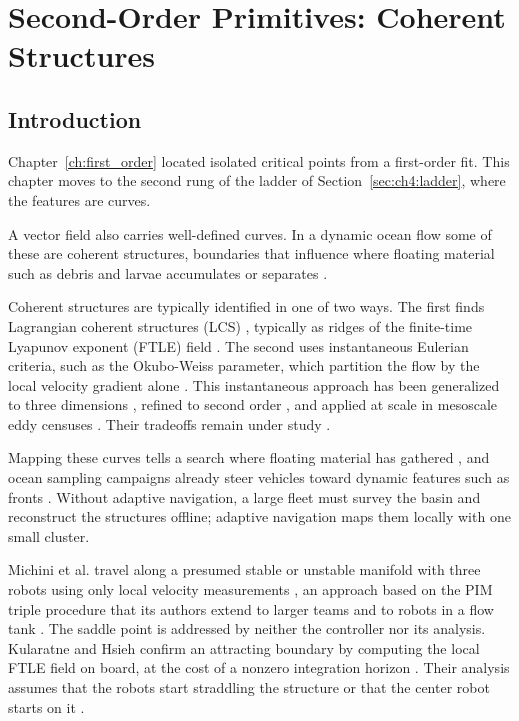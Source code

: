 \chapter{Second-Order Primitives: Coherent Structures}
\label{ch:second_order}

\section{Introduction}
\label{sec:ch7:intro}

Chapter~\ref{ch:first_order} located isolated critical points from a
first-order fit. This chapter moves to the second rung of the ladder of
Section~\ref{sec:ch4:ladder}, where the features are curves.

A vector field also carries well-defined curves. In a dynamic ocean flow some of these are coherent structures, boundaries that influence where floating material such as debris and larvae accumulates or separates \cite{56,50}.

Coherent structures are typically identified in one of two ways. The
first finds Lagrangian coherent structures (LCS) \cite{57}, typically as
ridges of the finite-time Lyapunov exponent (FTLE) field \cite{52}. The
second uses instantaneous Eulerian criteria, such as the Okubo-Weiss
parameter, which partition the flow by the local velocity gradient alone
\cite{4,48}. This instantaneous approach has been generalized to three
dimensions \cite{58}, refined to second order \cite{59}, and applied at
scale in mesoscale eddy censuses \cite{11}. Their tradeoffs remain under
study \cite{51,49,60,61}.

Mapping these curves tells a search where floating material has gathered
\cite{50}, and ocean sampling campaigns already steer vehicles toward
dynamic features such as fronts \cite{23,62,22}. Without adaptive
navigation, a large fleet must survey the basin and reconstruct the
structures offline; adaptive navigation maps them locally with one small
cluster.

Michini et al. travel along a presumed stable or
unstable manifold with three robots using only local velocity
measurements \cite{27}, an approach based on the PIM triple procedure
that its authors extend to larger teams \cite{63} and to robots in a flow
tank \cite{28}. The saddle point is addressed by neither the
controller nor its analysis.
Kularatne and Hsieh confirm an attracting boundary by computing the local
FTLE field on board, at the cost of a nonzero integration horizon
\cite{6}.
Their analysis assumes that the robots start straddling the structure
\cite{27,63} or that the center robot starts on it \cite{6}.


